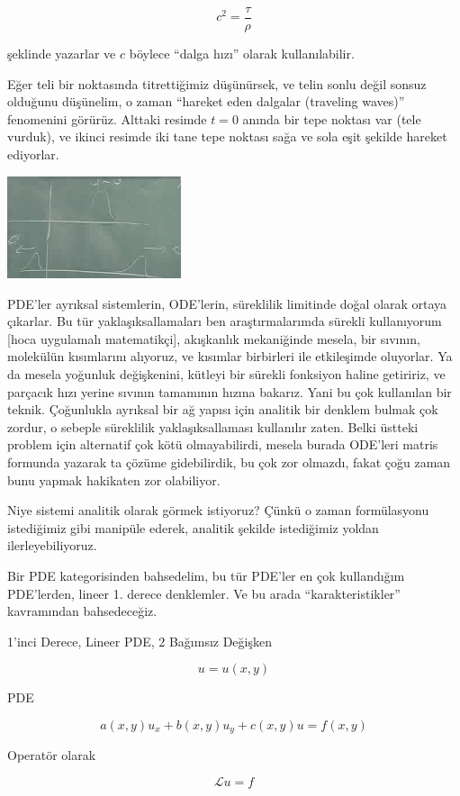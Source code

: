 \documentclass[12pt,fleqn]{article}\usepackage{../../common}
\begin{document}
$$ c^2 = \frac{\tau}{\rho} $$

şeklinde yazarlar ve $c$ böylece ``dalga hızı'' olarak kullanılabilir. 

Eğer teli bir noktasında titrettiğimiz düşünürsek, ve telin sonlu değil
sonsuz olduğunu düşünelim, o zaman ``hareket eden dalgalar (traveling
waves)'' fenomenini görürüz. Alttaki resimde $t=0$ anında bir tepe noktası
var (tele vurduk), ve ikinci resimde iki tane tepe noktası sağa ve sola
eşit şekilde hareket ediyorlar. 

\includegraphics[height=3cm]{1_10.png}

PDE'ler ayrıksal sistemlerin, ODE'lerin, süreklilik limitinde doğal olarak
ortaya çıkarlar. Bu tür yaklaşıksallamaları ben araştırmalarımda sürekli
kullanıyorum [hoca uygulamalı matematikçi], akışkanlık mekaniğinde mesela,
bir sıvının, molekülün kısımlarını alıyoruz, ve kısımlar birbirleri ile
etkileşimde oluyorlar. Ya da mesela yoğunluk değişkenini, kütleyi bir
sürekli fonksiyon haline getiririz, ve parçacık hızı yerine sıvının
tamamının hızına bakarız. Yani bu çok kullanılan bir teknik. Çoğunlukla
ayrıksal bir ağ yapısı için analitik bir denklem bulmak çok zordur, o
sebeple süreklilik yaklaşıksallaması kullanılır zaten. Belki üstteki
problem için alternatif çok kötü olmayabilirdi, mesela burada ODE'leri
matris formunda yazarak ta çözüme gidebilirdik, bu çok zor olmazdı, fakat
çoğu zaman bunu yapmak hakikaten zor olabiliyor.

Niye sistemi analitik olarak görmek istiyoruz? Çünkü o zaman formülasyonu
istediğimiz gibi manipüle ederek, analitik şekilde istediğimiz yoldan
ilerleyebiliyoruz.

Bir PDE kategorisinden bahsedelim, bu tür PDE'ler en çok kullandığım
PDE'lerden, lineer 1. derece denklemler. Ve bu arada ``karakteristikler''
kavramından bahsedeceğiz. 

1'inci Derece, Lineer PDE, 2 Bağımsız Değişken

$$ u = u(x,y) $$

PDE

$$ a(x,y)u_x + b(x,y)u_y + c(x,y)u = f(x,y) $$

Operatör olarak 

$$ \mathcal{L}u = f $$
\end{document}
